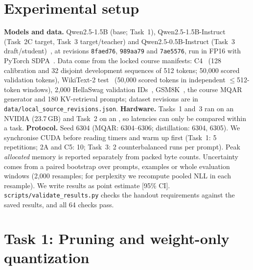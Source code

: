\documentclass{article}
\begin{document}
\section{Experimental setup}\label{sec:setup}
\textbf{Models and data.} Qwen2.5-1.5B (base; Task~1), Qwen2.5-1.5B-Instruct (Task~2C target, Task~3 target/teacher) and Qwen2.5-0.5B-Instruct (Task~3 draft/student)~\cite{qwen25}, at revisions \texttt{8faed76}, \texttt{989aa79} and \texttt{7ae5576}, run in FP16 with PyTorch SDPA~\cite{pytorch,hf}.
Data come from the locked course manifests: C4~\cite{c4} (128 calibration and 32 disjoint development sequences of 512 tokens; 50{,}000 scored validation tokens), WikiText-2 test~\cite{wikitext} (50{,}000 scored tokens in independent $\le$512-token windows), 2{,}000 HellaSwag validation IDs~\cite{hellaswag}, GSM8K~\cite{gsm8k}, the course MQAR generator and 180 KV-retrieval prompts; dataset revisions are in \texttt{data/local\_source\_revisions.json}.
\textbf{Hardware.} Tasks~1 and~3 ran on an NVIDIA \GPUone{} (23.7\,GB) and Task~2 on an \GPUtwo{}, so latencies can only be compared within a task.
\textbf{Protocol.} Seed 6304 (MQAR: 6304--6306; distillation: 6304, 6305). We synchronise CUDA before reading timers and warm up first (Task~1: 5 repetitions; 2A and C5: 10; Task~3: 2 counterbalanced runs per prompt). Peak \emph{allocated} memory is reported separately from packed byte counts.
Uncertainty comes from a paired bootstrap over prompts, examples or whole evaluation windows (2{,}000 resamples; for perplexity we recompute pooled NLL in each resample). We write results as point estimate [95\% CI].
\texttt{scripts/validate\_results.py} checks the handout requirements against the saved results, and all 64 checks pass.

\section{Task 1: Pruning and weight-only quantization}\label{sec:t1}
\end{document}

